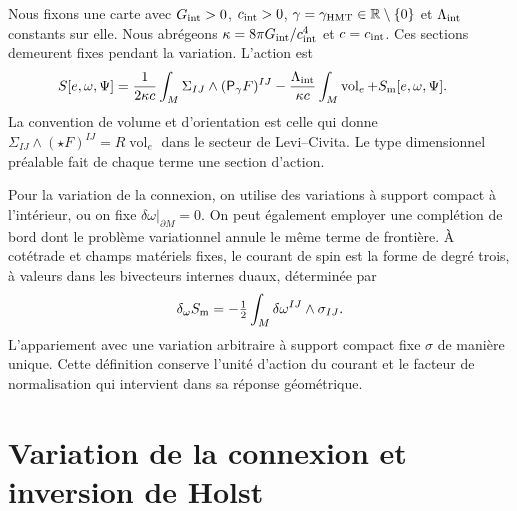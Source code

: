 \begin{HMTCompactSection}
Nous fixons une carte avec \(G_{\rm int}>0\), \(c_{\rm int}>0\),
\(\gamma=\gamma_{\rm HMT}\in\mathbb R\setminus\{0\}\) et
\(\Lambda_{\rm int}\) constants sur elle. Nous abrégeons
\(\kappa=8\pi G_{\rm int}/c_{\rm int}^4\) et \(c=c_{\rm int}\).
Ces sections demeurent fixes pendant la variation. L’action est
\begin{equation}
 \begin{split}
 S[e,\omega,\Psi]={}&
 \frac1{2\kappa c}\int_M\Sigma_{IJ}\wedge
                         (\mathsf P_\gamma F)^{IJ}
 -\frac{\Lambda_{\rm int}}{\kappa c}
                         \int_M\operatorname{vol}_e
 +S_{\rm m}[e,\omega,\Psi].
 \end{split}
 \label{x_reciprocidad:vii:eq:accion-cartan-holst}
\end{equation}
La convention de volume et d'orientation est celle qui donne
\(\Sigma_{IJ}\wedge(\star F)^{IJ}=R\operatorname{vol}_e\)
dans le secteur de Levi--Civita. Le type dimensionnel préalable fait de chaque
terme une section d'action.

Pour la variation de la connexion, on utilise des variations à support compact à l'intérieur, ou on fixe \(\delta\omega|_{\partial M}=0\). On peut également employer une complétion de bord dont le problème variationnel annule le même terme de frontière. À cotétrade et champs matériels fixes, le courant de spin est la forme de degré trois, à valeurs dans les bivecteurs internes duaux, déterminée par
\begin{equation}
 \delta_\omega S_{\rm m}
 =-\tfrac12\int_M\delta\omega^{IJ}\wedge\sigma_{IJ}.
 \label{x_reciprocidad:vii:eq:corriente-variacional}
\end{equation}
L'appariement avec une variation arbitraire à support compact fixe
\(\sigma\) de manière unique. Cette définition conserve l'unité
d'action du courant et le facteur de normalisation qui intervient dans
sa réponse géométrique.

\section{Variation de la connexion et inversion de Holst}
\label{x_reciprocidad:vii:subsec:variacion-holst}


\end{HMTCompactSection}
